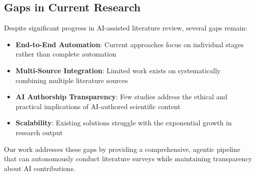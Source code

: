 \subsection{Gaps in Current Research}

Despite significant progress in AI-assisted literature review, several gaps remain:

\begin{itemize}
    \item \textbf{End-to-End Automation}: Current approaches focus on individual stages rather than complete automation
    \item \textbf{Multi-Source Integration}: Limited work exists on systematically combining multiple literature sources
    \item \textbf{AI Authorship Transparency}: Few studies address the ethical and practical implications of AI-authored scientific content
    \item \textbf{Scalability}: Existing solutions struggle with the exponential growth in research output
\end{itemize}

Our work addresses these gaps by providing a comprehensive, agentic pipeline that can autonomously conduct literature surveys while maintaining transparency about AI contributions.
